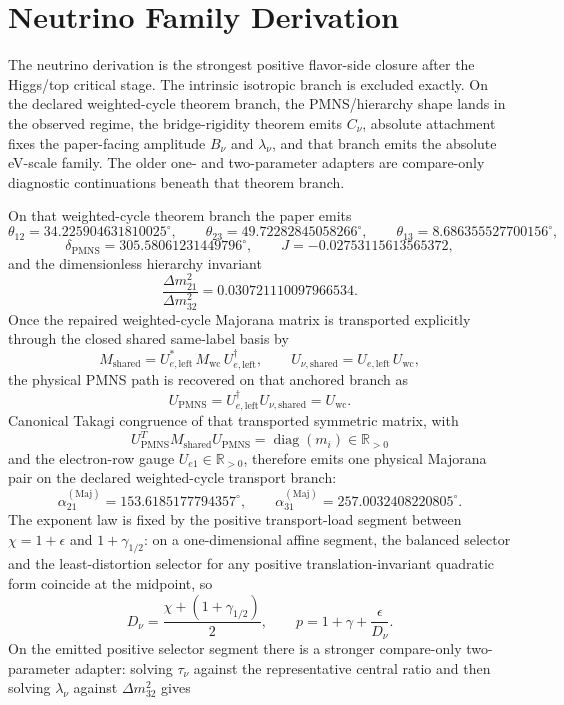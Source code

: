 \documentclass[11pt]{article}
\begin{document}
\section{Neutrino Family Derivation}

The neutrino derivation is the strongest positive flavor-side closure after the Higgs/top
critical stage. The intrinsic isotropic branch is excluded exactly. On the declared
weighted-cycle theorem branch, the PMNS/hierarchy shape lands in the observed regime, the
bridge-rigidity theorem emits \(C_\nu\), absolute attachment fixes the paper-facing amplitude
\(B_\nu\) and \(\lambda_\nu\), and that branch emits the absolute eV-scale family. The older one- and two-parameter adapters
are compare-only diagnostic continuations beneath that theorem branch.

On that weighted-cycle theorem branch the paper emits
\[
\theta_{12}=34.225904631810025^\circ,\qquad
\theta_{23}=49.72282845058266^\circ,\qquad
\theta_{13}=8.686355527700156^\circ,
\]
\[
\delta_{\mathrm{PMNS}}=305.58061231449796^\circ,\qquad
J=-0.02753115613565372,
\]
and the dimensionless hierarchy invariant
\[
\frac{\Delta m_{21}^2}{\Delta m_{32}^2}=0.030721110097966534.
\]
Once the repaired weighted-cycle Majorana matrix is transported explicitly through the closed shared same-label basis by
\[
M_{\mathrm{shared}}=U_{e,\mathrm{left}}^*\,M_{\mathrm{wc}}\,U_{e,\mathrm{left}}^\dagger,
\qquad
U_{\nu,\mathrm{shared}}=U_{e,\mathrm{left}}\,U_{\mathrm{wc}},
\]
the physical PMNS path is recovered on that anchored branch as
\[
U_{\mathrm{PMNS}}=U_{e,\mathrm{left}}^\dagger U_{\nu,\mathrm{shared}}=U_{\mathrm{wc}}.
\]
Canonical Takagi congruence of that transported symmetric matrix, with
\[
U_{\mathrm{PMNS}}^T M_{\mathrm{shared}} U_{\mathrm{PMNS}}=\operatorname{diag}(m_i)\in\mathbb R_{>0}
\]
and the electron-row gauge \(U_{e1}\in\mathbb R_{>0}\), therefore emits one physical Majorana pair on the declared weighted-cycle transport branch:
\[
\alpha_{21}^{(\mathrm{Maj})}=153.6185177794357^\circ,
\qquad
\alpha_{31}^{(\mathrm{Maj})}=257.0032408220805^\circ.
\]
The exponent law is fixed by the positive transport-load segment between
\(\chi=1+\epsilon\) and \(1+\gamma_{1/2}\): on a one-dimensional affine segment,
the balanced selector and the least-distortion selector for any positive
translation-invariant quadratic form coincide at the midpoint, so
\[
D_\nu=\frac{\chi+(1+\gamma_{1/2})}{2},
\qquad
p=1+\gamma+\frac{\epsilon}{D_\nu}.
\]
On the emitted positive selector segment there is a stronger compare-only two-parameter adapter: solving \(\tau_\nu\) against the representative central ratio and then solving \(\lambda_\nu\) against \(\Delta m_{32}^2\) gives
\end{document}
